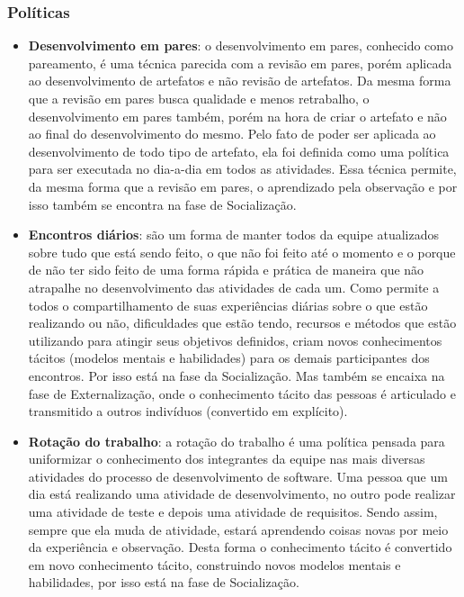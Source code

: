 \subsubsection{Políticas}
\begin{itemize}
\item \textbf{Desenvolvimento em pares}: o desenvolvimento em pares, conhecido como pareamento, é uma técnica parecida com a revisão em pares, porém aplicada ao desenvolvimento de artefatos e não revisão de artefatos. Da mesma forma que a revisão em pares busca qualidade e menos retrabalho, o desenvolvimento em pares também, porém na hora de criar o artefato e não ao final do desenvolvimento do mesmo. Pelo fato de poder ser aplicada ao desenvolvimento de todo tipo de artefato, ela foi definida como uma política para ser executada no dia-a-dia em todos as atividades. Essa técnica permite, da mesma forma que a revisão em pares, o aprendizado pela observação e por isso também se encontra na fase de Socialização.
\item \textbf{Encontros diários}: são um forma de manter todos da equipe atualizados sobre tudo que está sendo feito, o que não foi feito até o momento e o porque de não ter sido feito de uma forma rápida e prática de maneira que não atrapalhe no desenvolvimento das atividades de cada um. Como permite a todos o compartilhamento de suas experiências diárias sobre o que estão realizando ou não, dificuldades que estão tendo, recursos e métodos que estão utilizando para atingir seus objetivos definidos, criam novos conhecimentos tácitos (modelos mentais e habilidades) para os demais participantes dos encontros. Por isso está na fase da Socialização. Mas também se encaixa na fase de Externalização, onde o conhecimento tácito das pessoas é articulado e transmitido a outros indivíduos (convertido em explícito).
\item \textbf{Rotação do trabalho}: a rotação do trabalho é uma política pensada para uniformizar o conhecimento dos integrantes da equipe nas mais diversas atividades do processo de desenvolvimento de software. Uma pessoa que um dia está realizando uma atividade de desenvolvimento, no outro pode realizar uma atividade de teste e depois uma atividade de requisitos. Sendo assim, sempre que ela muda de atividade, estará aprendendo coisas novas por meio da experiência e observação. Desta forma o conhecimento tácito é convertido em novo conhecimento tácito, construindo novos modelos mentais e habilidades, por isso está na fase de Socialização. 
\end{itemize}

